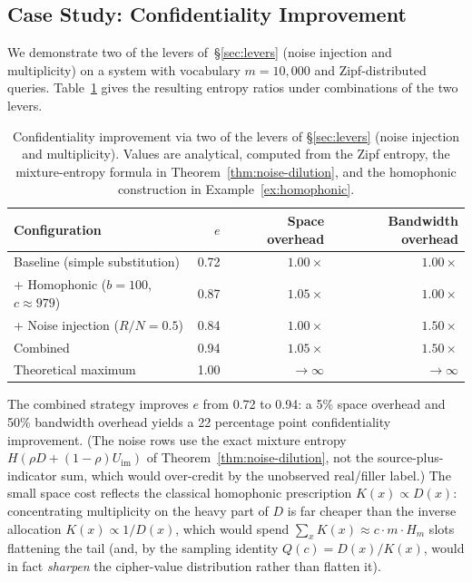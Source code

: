 \documentclass[11pt]{article}
\theoremstyle{definition}
\theoremstyle{plain}
\theoremstyle{remark}
\begin{document}
\subsection{Case Study: Confidentiality Improvement}

We demonstrate two of the levers of~\S\ref{sec:levers} (noise
injection and multiplicity) on a system with vocabulary
$m = 10{,}000$ and Zipf-distributed queries.  Table~\ref{tab:case-study}
gives the resulting entropy ratios under combinations of the two
levers.

\begin{table}[ht]
\centering
\caption{Confidentiality improvement via two of the levers of
\S\ref{sec:levers} (noise injection and multiplicity).  Values are
analytical, computed from the Zipf
entropy, the mixture-entropy formula in Theorem~\ref{thm:noise-dilution},
and the homophonic construction in Example~\ref{ex:homophonic}.}
\label{tab:case-study}
\begin{tabular}{@{}lrrr@{}}
\toprule
Configuration & $e$ & Space overhead & Bandwidth overhead \\
\midrule
Baseline (simple substitution) & 0.72 & $1.00\times$ & $1.00\times$ \\
+ Homophonic ($b = 100$, $c \approx 979$) & 0.87 & $1.05\times$ & $1.00\times$ \\
+ Noise injection ($R/N = 0.5$) & 0.84 & $1.00\times$ & $1.50\times$ \\
Combined & 0.94 & $1.05\times$ & $1.50\times$ \\
Theoretical maximum & 1.00 & $\to \infty$ & $\to \infty$ \\
\bottomrule
\end{tabular}
\end{table}

The combined strategy improves $e$ from 0.72 to 0.94: a 5\% space
overhead and 50\% bandwidth overhead yields a 22 percentage point
confidentiality improvement.  (The noise rows use the exact mixture
entropy $H(\rho D + (1-\rho)U_{\mathrm{im}})$ of
Theorem~\ref{thm:noise-dilution}, not the source-plus-indicator sum,
which would over-credit by the unobserved real/filler label.)  The small
space cost reflects the
classical homophonic prescription $K(x) \propto D(x)$: concentrating
multiplicity on the heavy part of $D$ is far cheaper than the inverse
allocation $K(x) \propto 1/D(x)$, which would spend
$\sum_x K(x) \approx c \cdot m \cdot H_m$ slots flattening the tail
(and, by the sampling identity $Q(c) = D(x)/K(x)$, would in fact
\emph{sharpen} the cipher-value distribution rather than flatten it).
\end{document}
